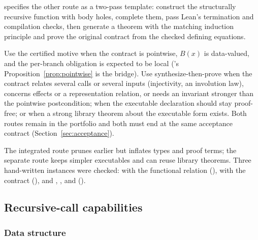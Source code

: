  specifies the other route as a two-pass template: construct the structurally recursive function with body holes, complete them, pass Lean's termination and compilation checks, then generate a theorem with the matching induction principle and prove the original contract from the checked defining equations.

\begin{decision}
Use the certified motive when the contract is pointwise, $B(x)$ is data-valued, and the per-branch obligation is expected to be local ('s Proposition~\ref{prop:pointwise} is the bridge). Use synthesize-then-prove when the contract relates several calls or several inputs (injectivity, an involution law), concerns effects or a representation relation, or needs an invariant stronger than the pointwise postcondition; when the executable declaration should stay proof-free; or when a strong library theorem about the executable form exists. Both routes remain in the portfolio and both must end at the same acceptance contract (Section~\ref{sec:acceptance}).
\end{decision}

The integrated route prunes earlier but inflates types and proof terms; the separate route keeps simpler executables and can reuse library theorems. Three hand-written instances were checked:  with the functional relation  (),  with the contract  (), and , , and  ().

\subsection{Recursive-call capabilities}\label{alg:rec-caps}

\subsubsection{Data structure}

